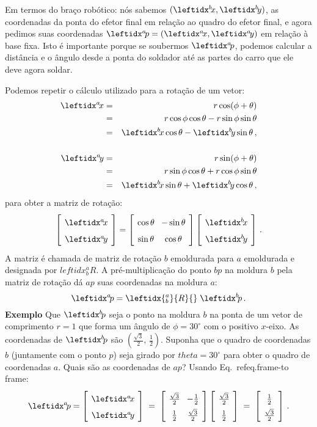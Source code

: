 Em termos do braço robótico: nós sabemos $(\bx,\by)$, as coordenadas da ponta do efetor final em relação ao quadro do efetor final, e agora pedimos suas coordenadas $\ap=(\ax,\ay)$ em relação à base fixa. Isto é importante porque se soubermos $\ap$, podemos calcular a distância e o ângulo desde a ponta do soldador até as partes do carro que ele deve agora soldar.

Podemos repetir o cálculo utilizado para a rotação de um vetor:
\begin{eqnarray*}
\ax &=& r\cos(\phi+\theta)\\
&=&r\cos\phi\cos\theta - r\sin\phi\sin\theta\\
&=&\bx\cos\theta - \by\sin\theta\,,\\
\\
\ay &=& r\sin(\phi+\theta)\\
&=&r\sin\phi\cos\theta + r\cos\phi\sin\theta\\
&=&\bx\sin\theta + \by\cos\theta\,,\\
\end{eqnarray*}
para obter a matriz de rotação:
\begin{equation}
\spacearray
\left[\begin{array}{c}\ax\\\ay\end{array}\right]=
\left[\begin{array}{cc}\cos\theta&-\sin\theta\\\sin\theta&\cos\theta\end{array}\right]
\left[\begin{array}{c}\bx\\\by\end{array}\right]\,.\label{eq.frame-to-frame}
\end{equation}
A matriz é chamada de matriz de rotação $b$ emoldurada para $a$ emoldurada e designada por $leftidx{^a_b}{R}$. A pré-multiplicação do ponto $bp$ na moldura $b$ pela matriz de rotação dá $ap$ suas coordenadas na moldura $a$:
\[
\ap = \leftidx{^a_b}{R}{} \; \bp\,.
\]
\noindent\textbf{Exemplo} Que $\bp$ seja o ponto na moldura $b$ na ponta de um vetor de comprimento $r=1$ que forma um ângulo de $\phi=30^{\circ}$ com o positivo $x$-eixo. As coordenadas de $\bp$ são $\left(\frac{\sqrt{3}}{2},\,\frac{1}{2}\right)$. Suponha que o quadro de coordenadas $b$ (juntamente com o ponto $p$) seja girado por $theta=30^{\circ}$ para obter o quadro de coordenadas $a$. Quais são as coordenadas de $ap$? Usando Eq.~ref{eq.frame-to frame}:
\[
\spacearray
\ap=
\left[\begin{array}{c}\ax\\\ay\end{array}\right]\;=\;
\left[\begin{array}{cc}\frac{\sqrt{3}}{2}&-\frac{1}{2}\\\frac{1}{2}&\frac{\sqrt{3}}{2}\end{array}\right]
\left[\begin{array}{c}\frac{\sqrt{3}}{2}\\\frac{1}{2}\end{array}\right]\;=\;
\left[\begin{array}{c}\frac{1}{2}\\\frac{\sqrt{3}}{2}\end{array}\right]\,.
\]
